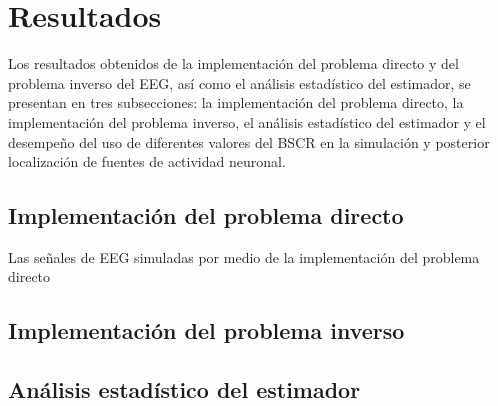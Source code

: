 %
\chapter{Resultados}
\label{sec:results}

Los resultados obtenidos de la implementación del problema directo y del problema inverso del EEG, así como el análisis estadístico del estimador, se presentan en tres subsecciones: la implementación del problema directo, la implementación del problema inverso, el análisis estadístico del estimador y el desempeño del uso de diferentes valores del BSCR en la simulación y posterior localización de fuentes de actividad neuronal.

\section{Implementación del problema directo}
\label{sec:results:direct}

Las señales de EEG simuladas por medio de la implementación del problema directo 

\section{Implementación del problema inverso}
\label{sec:results:inverse}

\section{Análisis estadístico del estimador}
\label{sec:results:estimator}